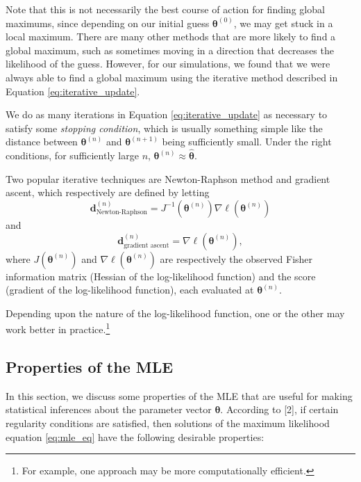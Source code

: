 \documentclass[
]{article}
\begin{document}
Note that this is not necessarily the best course of action for finding
global maximums, since depending on our initial guess
\(\boldsymbol{\theta}^{(0)}\), we may get stuck in a local maximum.
There are many other methods that are more likely to find a global
maximum, such as sometimes moving in a direction that decreases the
likelihood of the guess. However, for our simulations, we found that we
were always able to find a global maximum using the iterative method
described in Equation \eqref{eq:iterative_update}.

We do as many iterations in Equation \eqref{eq:iterative_update} as
necessary to satisfy some \emph{stopping condition}, which is usually
something simple like the distance between \(\boldsymbol{\theta}^{(n)}\)
and \(\boldsymbol{\theta}^{(n+1)}\) being sufficiently small. Under the
right conditions, for sufficiently large \(n\),
\(\boldsymbol{\theta}^{(n)} \approx \hat{\boldsymbol{\theta}}\).

Two popular iterative techniques are Newton-Raphson method and gradient
ascent, which respectively are defined by letting \[
\boldsymbol{d}^{(n)}_{\text{Newton-Raphson}} = J^{-1}(\boldsymbol{\theta}^{(n)}) \nabla \ell(\boldsymbol{\theta}^{(n)})
\] and \[
\boldsymbol{d}^{(n)}_{\text{gradient ascent}} = \nabla \ell(\boldsymbol{\theta}^{(n)}),
\] where \(J(\boldsymbol{\theta}^{(n)})\) and
\(\nabla \ell(\boldsymbol{\theta}^{(n)})\) are respectively the observed
Fisher information matrix (Hessian of the log-likelihood function) and
the score (gradient of the log-likelihood function), each evaluated at
\(\boldsymbol{\theta}^{(n)}\).

Depending upon the nature of the log-likelihood function, one or the
other may work better in
practice.\footnote{For example, one approach may be more
computationally efficient.}

\hypertarget{sec:mle_properties}{%
\subsection{Properties of the MLE}\label{sec:mle_properties}}

In this section, we discuss some properties of the MLE that are useful
for making statistical inferences about the parameter vector
\(\boldsymbol{\theta}\). According to {[}2{]}, if certain regularity
conditions are satisfied, then solutions of the maximum likelihood
equation \eqref{eq:mle_eq} have the following desirable properties:
\end{document}
